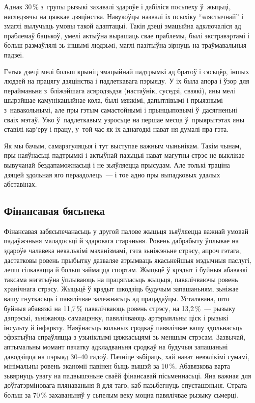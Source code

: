 Аднак 30\,\% з~групы рызыкі захавалі здароўе і дабіліся посьпеху ў~жыцьці, нягледзячы на цяжкае дзяцінства. Навукоўцы назвалі іх псыхіку ``элястычнай'' і змаглі вылучыць умовы такой адаптацыі. Такія дзеці эмацыйна адключаліся ад праблемаў бацькоў, умелі актыўна вырашаць свае праблемы, былі экстравэртамі і больш размаўлялі зь іншымі людзьмі, маглі пазітыўна зірнуць на траўмавальныя падзеі.

Гэтыя дзеці мелі больш крыніц эмацыйнай падтрымкі ад братоў і сясьцёр, іншых людзей на працягу дзяцінства і падлеткавага пэрыяду. У іх была апора і ўзор для перайманьня з~бліжэйшага асяродзьдзя (настаўнік, суседзі, сваякі), яны мелі шырэйшае камунікацыйнае кола, былі мяккімі, дапытлівымі і прыязнымі з~навакольнымі, але пры гэтым самастойнымі і прынцыповымі ў~дасягненьні сваіх мэтаў. Ужо ў~падлеткавым узросьце на першае месца ў~прыярытэтах яны ставілі кар'еру і працу, у~той час як іх аднагодкі нават ня думалі пра гэта.

Як мы бачым, самарэгуляцыя і тут выступае важным чыньнікам. Такім чынам, пры наяўнасьці падтрымкі і актыўнай пазыцыі нават магутны стрэс не выклікае вывучанай бездапаможнасьці і не зьяўляецца прысудам. Але толькі траціна дзяцей здольная яго пераадолець~--- і тое адно пры выпадковых удалых абставінах.

\subsection*{Фінансавая бясьпека}

Фінансавая забясьпечанасьць у другой палове жыцьця зьяўляецца важнай умовай падаўжэньня маладосьці й здаровага старэньня. Ровень дабрабыту ўплывае на здароўе чалавека некалькімі мэханізмамі, гэта зьніжэньне стрэсу, апроч гэтага, дастатковы ровень прыбытку дазваляе атрымваць якасьнейшыя мэдычныя паслугі, лепш сілкавацца й больш займацца спортам. Жыцьцё ў крэдыт і буйныя абавязкі таксама нэгатыўна ўплываюць на працягласьць жыцьця, павялічваючы ровень хранічнага стрэсу. Жыцьцё ў крэдыт шкодзіць будучым запашаньням, зьніжае вашу гнуткасьць і павялічвае залежнасьць ад працадаўцы. Усталявана, што буйныя абавязкі на 11,7\,\% павялічваюць ровень стрэсу, на 13,2\,\%~--- рызыку дэпрэсыі, зьніжаюць самаацэнку, павялічваюць артэрыяльны ціск і рызыкі інсульту й інфаркту. Наяўнасьць вольных сродкаў павялічвае вашу здольнасьць эфэктыўна спраўляцца з узьніклымі цяжкасьцямі зь меншым стрэсам. Зазвычай, аптымальны момант пачатку адкладваньня сродкаў на будучыя запашаньні даводзіцца на пэрыяд 30--40 гадоў. Пачніце зьбіраць, хай нават невялікімі сумамі, мінімальны ровень эканоміі павінен быць вышэй за 10\,\%. Абавязкова варта зьвярнуць увагу на падвышэньне сваёй фінансавай пісьменнасьці. Яна важная для доўгатэрміновага плянаваньня й для таго, каб пазьбегнуць спусташэньня. Страта больш за 70\,\% захаваньняў у сьпелым веку моцна павялічвае рызыку сьмерці.

